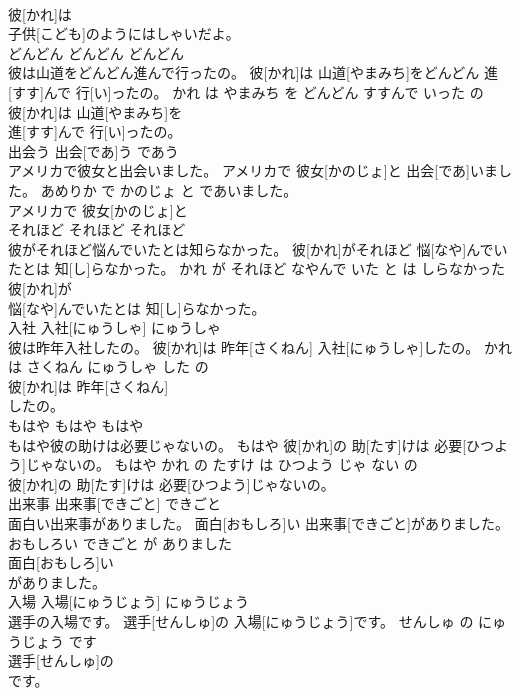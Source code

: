 \documentclass[8pt]{extreport}
\begin{document}
\begin{CJK}{UTF8}{min}
\\	彼[かれ]は
\\	子供[こども]のようにはしゃいだよ。			
\\	どんどん	どんどん	どんどん	
\\	彼は山道をどんどん進んで行ったの。	彼[かれ]は 山道[やまみち]をどんどん 進[すす]んで 行[い]ったの。	かれ は やまみち を どんどん すすんで いった の	
\\	彼[かれ]は 山道[やまみち]を
\\	進[すす]んで 行[い]ったの。			
\\	出会う	出会[であ]う	であう	
\\	アメリカで彼女と出会いました。	アメリカで 彼女[かのじょ]と 出会[であ]いました。	あめりか で かのじょ と であいました。	
\\	アメリカで 彼女[かのじょ]と
\\	それほど	それほど	それほど	
\\	彼がそれほど悩んでいたとは知らなかった。	彼[かれ]がそれほど 悩[なや]んでいたとは 知[し]らなかった。	かれ が それほど なやんで いた と は しらなかった	
\\	彼[かれ]が
\\	悩[なや]んでいたとは 知[し]らなかった。			
\\	入社	入社[にゅうしゃ]	にゅうしゃ	
\\	彼は昨年入社したの。	彼[かれ]は 昨年[さくねん] 入社[にゅうしゃ]したの。	かれ は さくねん にゅうしゃ した の	
\\	彼[かれ]は 昨年[さくねん]
\\	したの。			
\\	もはや	もはや	もはや	
\\	もはや彼の助けは必要じゃないの。	もはや 彼[かれ]の 助[たす]けは 必要[ひつよう]じゃないの。	もはや かれ の たすけ は ひつよう じゃ ない の	
\\	彼[かれ]の 助[たす]けは 必要[ひつよう]じゃないの。			
\\	出来事	出来事[できごと]	できごと	
\\	面白い出来事がありました。	面白[おもしろ]い 出来事[できごと]がありました。	おもしろい できごと が ありました	
\\	面白[おもしろ]い
\\	がありました。			
\\	入場	入場[にゅうじょう]	にゅうじょう	
\\	選手の入場です。	選手[せんしゅ]の 入場[にゅうじょう]です。	せんしゅ の にゅうじょう です	
\\	選手[せんしゅ]の
\\	です。			

\end{CJK}
\end{document}
